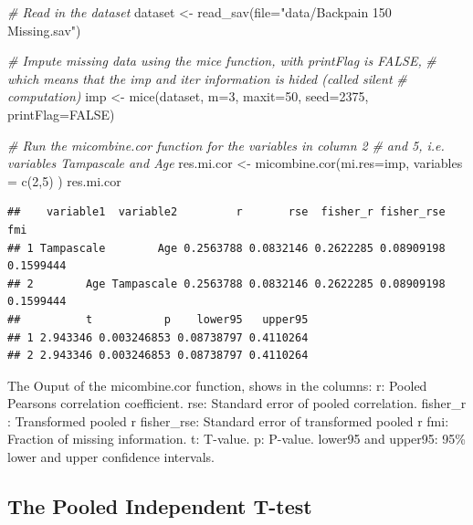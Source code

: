\documentclass[
]{book}
\newenvironment{Shaded}{\begin{snugshade}}{\end{snugshade}}
\newcommand{\AttributeTok}[1]{\textcolor[rgb]{0.77,0.63,0.00}{#1}}
\newcommand{\CommentTok}[1]{\textcolor[rgb]{0.56,0.35,0.01}{\textit{#1}}}
\newcommand{\ConstantTok}[1]{\textcolor[rgb]{0.00,0.00,0.00}{#1}}
\newcommand{\DecValTok}[1]{\textcolor[rgb]{0.00,0.00,0.81}{#1}}
\newcommand{\FunctionTok}[1]{\textcolor[rgb]{0.00,0.00,0.00}{#1}}
\newcommand{\NormalTok}[1]{#1}
\newcommand{\OtherTok}[1]{\textcolor[rgb]{0.56,0.35,0.01}{#1}}
\newcommand{\StringTok}[1]{\textcolor[rgb]{0.31,0.60,0.02}{#1}}
\begin{document}
\begin{Shaded}
\begin{Highlighting}[]
\CommentTok{\# Read in the dataset }
\NormalTok{dataset }\OtherTok{\textless{}{-}} \FunctionTok{read\_sav}\NormalTok{(}\AttributeTok{file=}\StringTok{"data/Backpain 150 Missing.sav"}\NormalTok{)}

\CommentTok{\# Impute missing data using the mice function, with printFlag is FALSE, }
\CommentTok{\# which means that the imp and iter information is hided (called silent }
\CommentTok{\# computation)}
\NormalTok{imp }\OtherTok{\textless{}{-}} \FunctionTok{mice}\NormalTok{(dataset, }\AttributeTok{m=}\DecValTok{3}\NormalTok{, }\AttributeTok{maxit=}\DecValTok{50}\NormalTok{, }\AttributeTok{seed=}\DecValTok{2375}\NormalTok{, }\AttributeTok{printFlag=}\ConstantTok{FALSE}\NormalTok{)}

\CommentTok{\# Run the micombine.cor function for the variables in column 2 }
\CommentTok{\# and 5, i.e. variables Tampascale and Age}
\NormalTok{res.mi.cor }\OtherTok{\textless{}{-}} \FunctionTok{micombine.cor}\NormalTok{(}\AttributeTok{mi.res=}\NormalTok{imp, }\AttributeTok{variables =} \FunctionTok{c}\NormalTok{(}\DecValTok{2}\NormalTok{,}\DecValTok{5}\NormalTok{) )}
\NormalTok{res.mi.cor}
\end{Highlighting}
\end{Shaded}

\begin{verbatim}
##    variable1  variable2         r       rse  fisher_r fisher_rse       fmi
## 1 Tampascale        Age 0.2563788 0.0832146 0.2622285 0.08909198 0.1599444
## 2        Age Tampascale 0.2563788 0.0832146 0.2622285 0.08909198 0.1599444
##          t           p    lower95   upper95
## 1 2.943346 0.003246853 0.08738797 0.4110264
## 2 2.943346 0.003246853 0.08738797 0.4110264
\end{verbatim}

The Ouput of the micombine.cor function, shows in the columns:
r: Pooled Pearsons correlation coefficient.
rse: Standard error of pooled correlation.
fisher\_r : Transformed pooled r
fisher\_rse: Standard error of transformed pooled r
fmi: Fraction of missing information.
t: T-value.
p: P-value.
lower95 and upper95: 95\% lower and upper confidence intervals.

\hypertarget{the-pooled-independent-t-test}{%
\subsection{The Pooled Independent T-test}\label{the-pooled-independent-t-test}}
\end{document}
